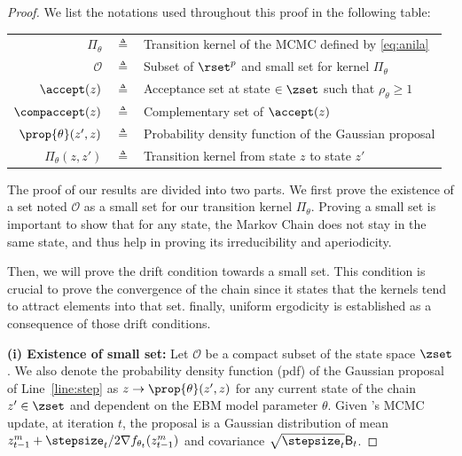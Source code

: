 \documentclass[10pt,twocolumn,letterpaper]{article}
\begin{document}
\begin{proof}



We list the notations used throughout this proof in the following table:

\begin{table}[htbp]
\begin{tabular}{r c p{17cm} }
\toprule
$\Pi_\theta$ & $\triangleq$ &  Transition kernel of the MCMC defined by \eqref{eq:anila}\\
$\mathcal{O}$ & $\triangleq$ & Subset of $\rset^p$ and small set for kernel $\Pi_\theta$\\
$\accept(z)$ & $\triangleq$ & Acceptance set at state $ \in \zset$ such that $\rho_\theta \geq 1$ \\
$\compaccept(z)$ & $\triangleq$ & Complementary set of  $\accept(z)$\\
$\prop{\theta}(z',z)$ & $\triangleq$ &  Probability density function of the Gaussian proposal\\
$\Pi_\theta(z, z')$ & $\triangleq$ & Transition kernel from state $z$ to state $z'$\\
\bottomrule
\end{tabular}
\label{tab:notations}
\end{table}

The proof of our results are divided into two parts.
We first prove the existence of a set noted $\mathcal{O}$ as a small set for our transition kernel $\Pi_\theta$.
Proving a small set is important to show that for any state, the Markov Chain does not stay in the same state, and thus help in proving its irreducibility and aperiodicity.

Then, we will prove the drift condition towards a small set.
This condition is crucial to prove the convergence of the chain since it states that the kernels tend to attract elements into that set. 
finally, uniform ergodicity is established as a consequence of those drift conditions.

\medskip
\noindent \textbf{(i) Existence of small set: }
Let $\mathcal{O}$ be a compact subset of the state space $\zset$.
We also denote the probability density function (pdf) of the Gaussian proposal of Line~\ref{line:step} as $z \to \prop{\theta}(z',z)$ for any current state of the chain $z' \in \zset$ and dependent on the EBM model parameter $\theta$.
Given \algo's MCMC update, at iteration $t$, the proposal is a Gaussian distribution of mean $z_{t-1}^m+ \stepsize_t/2  \nabla f_{\theta_t}(z_{t-1}^m)$ and covariance $\sqrt{\stepsize_t} \mathsf{B}_t$.


\end{proof}
\end{document}

